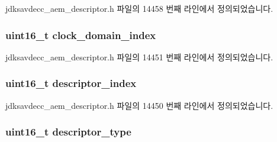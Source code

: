jdksavdecc\+\_\+aem\+\_\+descriptor.\+h 파일의 14458 번째 라인에서 정의되었습니다.

\subsubsection[{\texorpdfstring{clock\+\_\+domain\+\_\+index}{clock_domain_index}}]{\setlength{\rightskip}{0pt plus 5cm}uint16\+\_\+t clock\+\_\+domain\+\_\+index}\hypertarget{structjdksavdecc__descriptor__stream__port_a6608f023d147b556a49527d568abed8e}{}\label{structjdksavdecc__descriptor__stream__port_a6608f023d147b556a49527d568abed8e}


jdksavdecc\+\_\+aem\+\_\+descriptor.\+h 파일의 14451 번째 라인에서 정의되었습니다.

\subsubsection[{\texorpdfstring{descriptor\+\_\+index}{descriptor_index}}]{\setlength{\rightskip}{0pt plus 5cm}uint16\+\_\+t descriptor\+\_\+index}\hypertarget{structjdksavdecc__descriptor__stream__port_a042bbc76d835b82d27c1932431ee38d4}{}\label{structjdksavdecc__descriptor__stream__port_a042bbc76d835b82d27c1932431ee38d4}


jdksavdecc\+\_\+aem\+\_\+descriptor.\+h 파일의 14450 번째 라인에서 정의되었습니다.

\subsubsection[{\texorpdfstring{descriptor\+\_\+type}{descriptor_type}}]{\setlength{\rightskip}{0pt plus 5cm}uint16\+\_\+t descriptor\+\_\+type}\hypertarget{structjdksavdecc__descriptor__stream__port_ab7c32b6c7131c13d4ea3b7ee2f09b78d}{}\label{structjdksavdecc__descriptor__stream__port_ab7c32b6c7131c13d4ea3b7ee2f09b78d}


